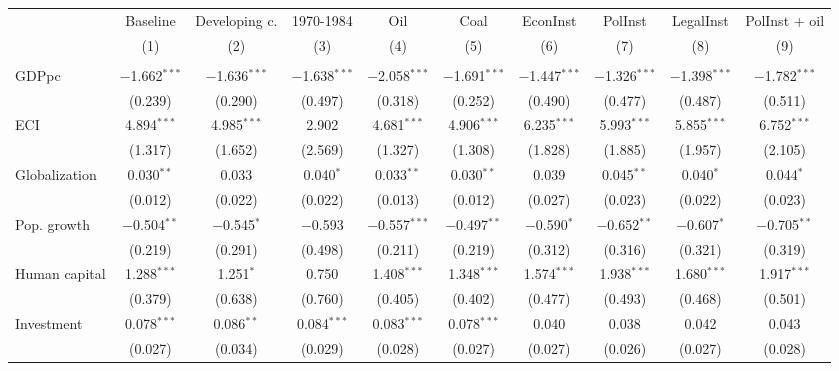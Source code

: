 
\begin{tabular}{@{\hspace{5pt}}l@{\hspace{5pt}}ccccccccc} 
\toprule 
 & Baseline & Developing c. & 1970-1984 & Oil & Coal & EconInst & PolInst & LegalInst & PolInst + oil \\ 
 & (1) & (2) & (3) & (4) & (5) & (6) & (7) & (8) & (9)\\ 
\midrule  
\\[-2.1ex] GDPpc & $-$1.662$^{***}$ & $-$1.636$^{***}$ & $-$1.638$^{***}$ & $-$2.058$^{***}$ & $-$1.691$^{***}$ & $-$1.447$^{***}$ & $-$1.326$^{***}$ & $-$1.398$^{***}$ & $-$1.782$^{***}$ \\ 
  & (0.239) & (0.290) & (0.497) & (0.318) & (0.252) & (0.490) & (0.477) & (0.487) & (0.511) \\ 
 \addlinespace 
 ECI & 4.894$^{***}$ & 4.985$^{***}$ & 2.902 & 4.681$^{***}$ & 4.906$^{***}$ & 6.235$^{***}$ & 5.993$^{***}$ & 5.855$^{***}$ & 6.752$^{***}$ \\ 
  & (1.317) & (1.652) & (2.569) & (1.327) & (1.308) & (1.828) & (1.885) & (1.957) & (2.105) \\ 
 \addlinespace 
 Globalization & 0.030$^{**}$ & 0.033 & 0.040$^{*}$ & 0.033$^{**}$ & 0.030$^{**}$ & 0.039 & 0.045$^{**}$ & 0.040$^{*}$ & 0.044$^{*}$ \\ 
  & (0.012) & (0.022) & (0.022) & (0.013) & (0.012) & (0.027) & (0.023) & (0.022) & (0.023) \\ 
 \addlinespace 
 Pop. growth & $-$0.504$^{**}$ & $-$0.545$^{*}$ & $-$0.593 & $-$0.557$^{***}$ & $-$0.497$^{**}$ & $-$0.590$^{*}$ & $-$0.652$^{**}$ & $-$0.607$^{*}$ & $-$0.705$^{**}$ \\ 
  & (0.219) & (0.291) & (0.498) & (0.211) & (0.219) & (0.312) & (0.316) & (0.321) & (0.319) \\ 
 \addlinespace 
 Human capital & 1.288$^{***}$ & 1.251$^{*}$ & 0.750 & 1.408$^{***}$ & 1.348$^{***}$ & 1.574$^{***}$ & 1.938$^{***}$ & 1.680$^{***}$ & 1.917$^{***}$ \\ 
  & (0.379) & (0.638) & (0.760) & (0.405) & (0.402) & (0.477) & (0.493) & (0.468) & (0.501) \\ 
 \addlinespace 
 Investment & 0.078$^{***}$ & 0.086$^{**}$ & 0.084$^{***}$ & 0.083$^{***}$ & 0.078$^{***}$ & 0.040 & 0.038 & 0.042 & 0.043 \\ 
  & (0.027) & (0.034) & (0.029) & (0.028) & (0.027) & (0.027) & (0.026) & (0.027) & (0.028) \\ 

\end{tabular}
